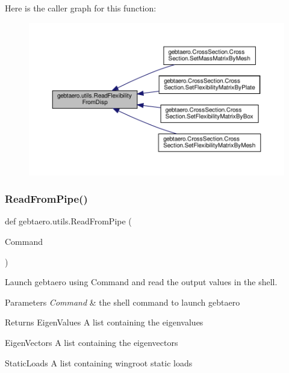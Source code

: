 Here is the caller graph for this function\+:\nopagebreak
\begin{figure}[H]
\begin{center}
\leavevmode
\includegraphics[width=350pt]{namespacegebtaero_1_1utils_a2bc8449983854bcc37d204283f55c599_icgraph}
\end{center}
\end{figure}
\mbox{\label{namespacegebtaero_1_1utils_ad35c5461b34c42fdf3fb6abb8c21a46d}} 
\subsubsection{\texorpdfstring{Read\+From\+Pipe()}{ReadFromPipe()}}
{\footnotesize\ttfamily def gebtaero.\+utils.\+Read\+From\+Pipe (\begin{DoxyParamCaption}\item[{}]{Command }\end{DoxyParamCaption})}



Launch gebtaero using Command and read the output values in the shell. 


\begin{DoxyParams}{Parameters}
{\em Command} & the shell command to launch gebtaero \\
\hline
\end{DoxyParams}
\begin{DoxyReturn}{Returns}
Eigen\+Values A list containing the eigenvalues 

Eigen\+Vectors A list containing the eigenvectors 

Static\+Loads A list containing wingroot static loads 
\end{DoxyReturn}


